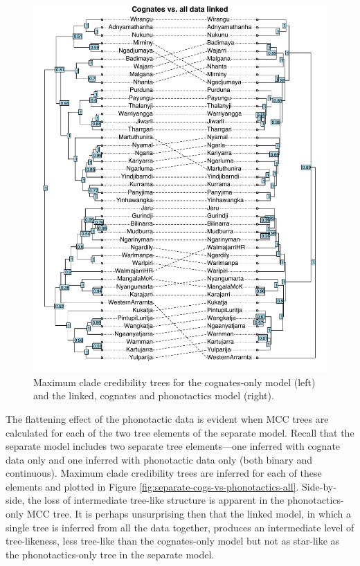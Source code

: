 \documentclass[]{article}
\begin{document}
\begin{figure}
\centering
\includegraphics{fig/cogs_vs_linked_all.pdf}
\caption{\label{fig:cogs-vs-linked-all}Maximum clade credibility trees for the cognates-only model (left) and the linked, cognates and phonotactics model (right).}
\end{figure}

The flattening effect of the phonotactic data is evident when MCC trees are calculated for each of the two tree elements of the separate model. Recall that the separate model includes two separate tree elements---one inferred with cognate data only and one inferred with phonotactic data only (both binary and continuous). Maximum clade credibility trees are inferred for each of these elements and plotted in Figure \ref{fig:separate-cogs-vs-phonotactics-all}. Side-by-side, the loss of intermediate tree-like structure is apparent in the phonotactics-only MCC tree. It is perhaps unsurprising then that the linked model, in which a single tree is inferred from all the data together, produces an intermediate level of tree-likeness, less tree-like than the cognates-only model but not as star-like as the phonotactics-only tree in the separate model.
\end{document}
